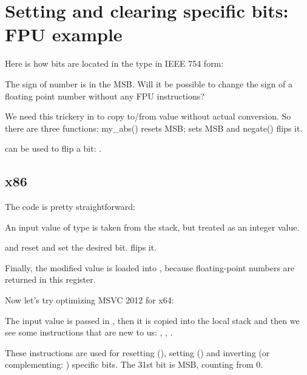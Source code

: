 \section{Setting and clearing specific bits: \ac{FPU} example}


Here is how bits are located in the \Tfloat type in IEEE 754 form:



The sign of number is in the \ac{MSB}. 
Will it be possible to change the sign of a floating point number without any FPU instructions?



We need this trickery in \CCpp to copy to/from \Tfloat value without actual conversion.
So there are three functions: my\_abs() resets \ac{MSB};  sets \ac{MSB} and negate() flips it.

\XOR can be used to flip a bit: .

\subsection{x86}

The code is pretty straightforward:



An input value of type \Tfloat is taken from the stack, but treated as an integer value.

\AND and \OR reset and set the desired bit.
\XOR flips it.

Finally, the modified value is loaded into , because floating-point numbers are returned in this register.

Now let's try optimizing MSVC 2012 for x64:




The input value is passed in , then it is copied into the local stack and then we see 
some instructions that are new to us: \BTR, \BTS, \BTC.

These instructions are used for resetting (\BTR), setting (\BTS) and inverting (or complementing: \BTC) 
specific bits.
The 31st bit is \ac{MSB}, counting from 0.

